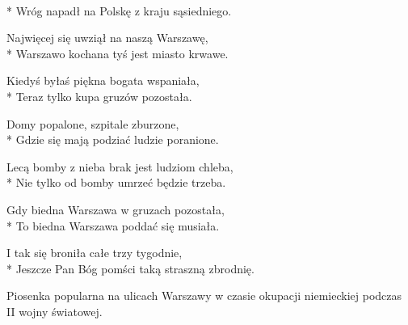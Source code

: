 \begin{lyrics}[longestline={Jeszcze Pan Bóg pomści taką straszną zbrodnię.}]

\\*
Wróg napadł na Polskę z kraju sąsiedniego.

Najwięcej się uwziął na naszą Warszawę,\\*
Warszawo kochana tyś jest miasto krwawe.

Kiedyś byłaś piękna bogata wspaniała,\\*
Teraz tylko kupa gruzów pozostała.

Domy popalone, szpitale zburzone,\\*
Gdzie się mają podziać ludzie poranione.

Lecą bomby z nieba brak jest ludziom chleba,\\*
Nie tylko od bomby umrzeć będzie trzeba.

Gdy biedna Warszawa w gruzach pozostała,\\*
To biedna Warszawa poddać się musiała.

I tak się broniła całe trzy tygodnie,\\*
Jeszcze Pan Bóg pomści taką straszną zbrodnię.
\end{lyrics}



\begin{info}Piosenka popularna na ulicach Warszawy w czasie okupacji niemieckiej podczas II wojny światowej.\end{info}

